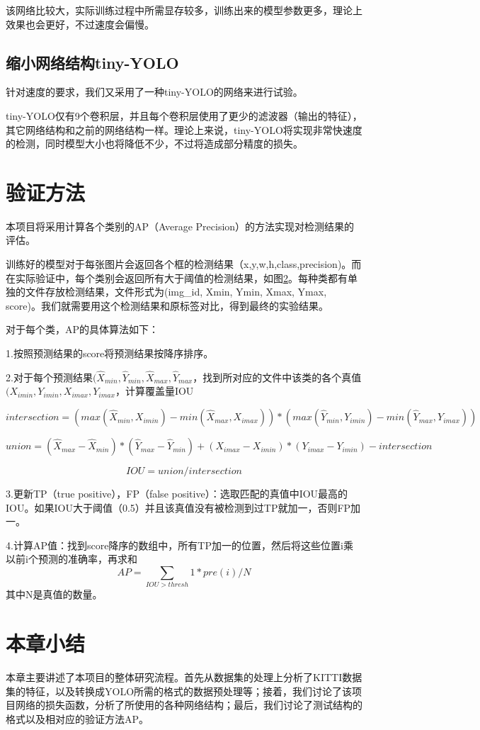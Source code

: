 {{	该网络比较大，实际训练过程中所需显存较多，训练出来的模型参数更多，理论上效果也会更好，不过速度会偏慢。
}

\subsection{缩小网络结构tiny-YOLO}{
	针对速度的要求，我们又采用了一种tiny-YOLO的网络来进行试验。

	tiny-YOLO仅有9个卷积层，并且每个卷积层使用了更少的滤波器（输出的特征），其它网络结构和之前的网络结构一样。理论上来说，tiny-YOLO将实现非常快速度的检测，同时模型大小也将降低不少，不过将造成部分精度的损失。
}
}

\section{验证方法}{
	本项目将采用计算各个类别的AP（Average Precision）的方法实现对检测结果的评估。

	训练好的模型对于每张图片会返回各个框的检测结果（x,y,w,h,class,precision)。而在实际验证中，每个类别会返回所有大于阈值的检测结果，如图\ref{}。每种类都有单独的文件存放检测结果，文件形式为(img_id, Xmin, Ymin, Xmax, Ymax, score)。我们就需要用这个检测结果和原标签对比，得到最终的实验结果。

	对于每个类，AP的具体算法如下：

	1.按照预测结果的score将预测结果按降序排序。

	2.对于每个预测结果$(\hat{X}_{min},\hat{Y}_{min},\hat{X}_{max},\hat{Y}_{max}$，找到所对应的文件中该类的各个真值$({X}_{imin},{Y}_{imin},{X}_{imax},{Y}_{imax}$，计算覆盖量IOU

	$$intersection = (max(\hat{X}_{min},{X}_{imin}) - min(\hat{X}_{max},{X}_{imax})) * (max(\hat{Y}_{min},{Y}_{imin}) - min(\hat{Y}_{max},{Y}_{imax}))$$

	$$union = (\hat{X}_{max} - \hat{X}_{min}) * (\hat{Y}_{max} - \hat{Y}_{min}) + ({X}_{imax} - {X}_{imin}) * ({Y}_{imax} - {Y}_{imin}) - intersection$$

	$$IOU = union / intersection$$

	3.更新TP（true positive），FP（false positive）：选取匹配的真值中IOU最高的IOU。如果IOU大于阈值（0.5）并且该真值没有被检测到过TP就加一，否则FP加一。

	4.计算AP值：找到score降序的数组中，所有TP加一的位置，然后将这些位置i乘以前i个预测的准确率，再求和
	$$AP = \sum_{IOU>thresh}1*pre(i) / N$$其中N是真值的数量。
}

\section{本章小结}{
	本章主要讲述了本项目的整体研究流程。首先从数据集的处理上分析了KITTI数据集的特征，以及转换成YOLO所需的格式的数据预处理等；接着，我们讨论了该项目网络的损失函数，分析了所使用的各种网络结构；最后，我们讨论了测试结构的格式以及相对应的验证方法AP。
}

